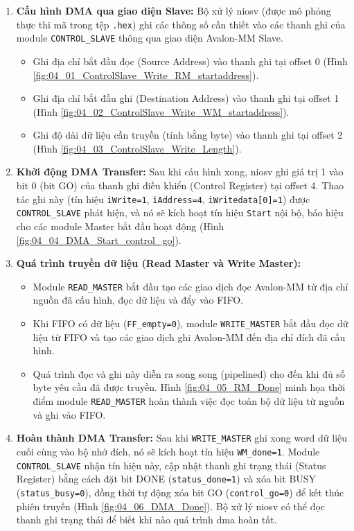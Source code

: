 \begin{enumerate}
    \item \textbf{Cấu hình DMA qua giao diện Slave:} Bộ xử lý \acrshort{niosv} (được mô phỏng thực thi mã trong tệp \texttt{.hex}) ghi các thông số cần thiết vào các thanh ghi của module \texttt{CONTROL\_SLAVE} thông qua giao diện Avalon-MM Slave.
    \begin{itemize}
        \item Ghi địa chỉ bắt đầu đọc (Source Address) vào thanh ghi tại offset 0 (Hình \ref{fig:04_01_ControlSlave_Write_RM_startaddress}).
        \item Ghi địa chỉ bắt đầu ghi (Destination Address) vào thanh ghi tại offset 1 (Hình \ref{fig:04_02_ControlSlave_Write_WM_startaddress}).
        \item Ghi độ dài dữ liệu cần truyền (tính bằng byte) vào thanh ghi tại offset 2 (Hình \ref{fig:04_03_ControlSlave_Write_Length}).
    \end{itemize}

    \item \textbf{Khởi động DMA Transfer:} Sau khi cấu hình xong, \acrshort{niosv} ghi giá trị 1 vào bit 0 (bit GO) của thanh ghi điều khiển (Control Register) tại offset 4. Thao tác ghi này (tín hiệu \texttt{iWrite=1}, \texttt{iAddress=4}, \texttt{iWritedata[0]=1}) được \texttt{CONTROL\_SLAVE} phát hiện, và nó sẽ kích hoạt tín hiệu \texttt{Start} nội bộ, báo hiệu cho các module Master bắt đầu hoạt động (Hình \ref{fig:04_04_DMA_Start_control_go}).

    \item \textbf{Quá trình truyền dữ liệu (Read Master và Write Master):}
    \begin{itemize}
        \item Module \texttt{READ\_MASTER} bắt đầu tạo các giao dịch đọc Avalon-MM từ địa chỉ nguồn đã cấu hình, đọc dữ liệu và đẩy vào FIFO.
        \item Khi FIFO có dữ liệu (\texttt{FF\_empty=0}), module \texttt{WRITE\_MASTER} bắt đầu đọc dữ liệu từ FIFO và tạo các giao dịch ghi Avalon-MM đến địa chỉ đích đã cấu hình.
        \item Quá trình đọc và ghi này diễn ra song song (pipelined) cho đến khi đủ số byte yêu cầu đã được truyền. Hình \ref{fig:04_05_RM_Done} minh họa thời điểm module \texttt{READ\_MASTER} hoàn thành việc đọc toàn bộ dữ liệu từ nguồn và ghi vào FIFO.
    \end{itemize}

    \item \textbf{Hoàn thành DMA Transfer:} Sau khi \texttt{WRITE\_MASTER} ghi xong word dữ liệu cuối cùng vào bộ nhớ đích, nó sẽ kích hoạt tín hiệu \texttt{WM\_done=1}. Module \texttt{CONTROL\_SLAVE} nhận tín hiệu này, cập nhật thanh ghi trạng thái (Status Register) bằng cách đặt bit DONE (\texttt{status\_done=1}) và xóa bit BUSY (\texttt{status\_busy=0}), đồng thời tự động xóa bit GO (\texttt{control\_go=0}) để kết thúc phiên truyền (Hình \ref{fig:04_06_DMA_Done}). Bộ xử lý \acrshort{niosv} có thể đọc thanh ghi trạng thái để biết khi nào quá trình \acrshort{dma} hoàn tất.


\end{enumerate}
